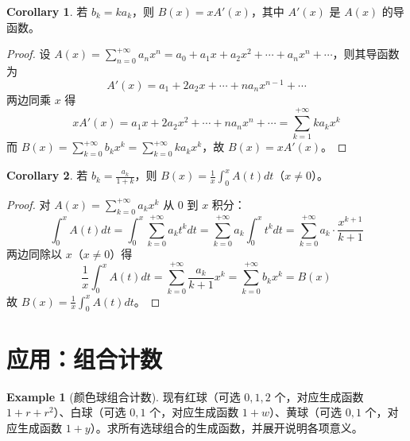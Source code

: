 \documentclass[oneside]{book}
\theoremstyle{definition}
\newtheorem{example}{Example}[section]
\newtheorem{corollary}{Corollary}[section]
\begin{document}
\begin{corollary}
	若 \( b_k = k a_k \)，则 \( B(x) = x A'(x) \)，其中 \( A'(x) \) 是 \( A(x) \) 的导函数。
\end{corollary}

\begin{proof}
	设 \( A(x) = \sum_{n=0}^{+\infty} a_n x^n = a_0 + a_1 x + a_2 x^2 + \cdots + a_n x^n + \cdots \)，则其导函数为
	\[
	A'(x) = a_1 + 2a_2 x + \cdots + n a_n x^{n-1} + \cdots
	\]
	两边同乘 \( x \) 得
	\[
	x A'(x) = a_1 x + 2a_2 x^2 + \cdots + n a_n x^n + \cdots = \sum_{k=1}^{+\infty} k a_k x^k
	\]
	而 \( B(x) = \sum_{k=0}^{+\infty} b_k x^k = \sum_{k=0}^{+\infty} k a_k x^k \)，故 \( B(x) = x A'(x) \)。
\end{proof}

\begin{corollary}
	若 \( b_k = \frac{a_k}{1 + k} \)，则 \( B(x) = \frac{1}{x} \int_0^x A(t) dt \)（\( x \neq 0 \)）。
\end{corollary}

\begin{proof}
	对 \( A(x) = \sum_{k=0}^{+\infty} a_k x^k \) 从 \( 0 \) 到 \( x \) 积分：
	\[
	\int_0^x A(t) dt = \int_0^x \sum_{k=0}^{+\infty} a_k t^k dt = \sum_{k=0}^{+\infty} a_k \int_0^x t^k dt = \sum_{k=0}^{+\infty} a_k \cdot \frac{x^{k+1}}{k+1}
	\]
	两边同除以 \( x \)（\( x \neq 0 \)）得
	\[
	\frac{1}{x} \int_0^x A(t) dt = \sum_{k=0}^{+\infty} \frac{a_k}{k+1} x^k = \sum_{k=0}^{+\infty} b_k x^k = B(x)
	\]
	故 \( B(x) = \frac{1}{x} \int_0^x A(t) dt \)。
\end{proof}

\section{应用：组合计数}

\begin{example}[颜色球组合计数]
	现有红球（可选 \( 0,1,2 \) 个，对应生成函数 \( 1 + r + r^2 \)）、白球（可选 \( 0,1 \) 个，对应生成函数 \( 1 + w \)）、黄球（可选 \( 0,1 \) 个，对应生成函数 \( 1 + y \)）。求所有选球组合的生成函数，并展开说明各项意义。
\end{example}
\end{document}
